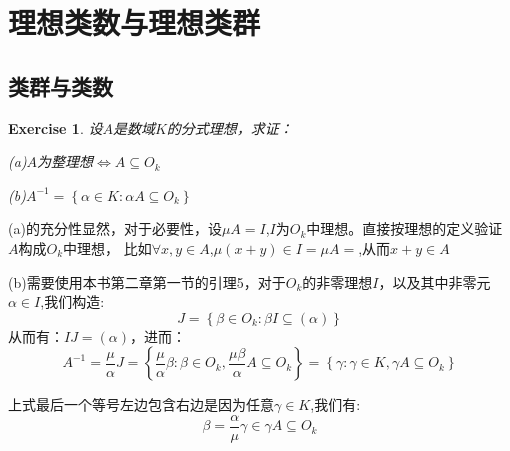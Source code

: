 \documentclass[12pt, a4paper]{ctexart}
\newenvironment{prooff}{{\noindent\it\textcolor{cyan!40!black}{Proof}:}\quad}{\par}
\newcommand{\bbrace}[1]{\left\{ #1 \right\} }
\newtheorem{exer}{Exercise}[subsection]
\begin{document}
\section{理想类数与理想类群}
\subsection{类群与类数}
\begin{exer}
    设$A$是数域$K$的分式理想，求证：

    (a)$A$为整理想$\Leftrightarrow A\subseteq O_{k} $

    (b)$A^{-1}=\bbrace{\alpha \in K:\alpha A\subseteq O_{k}}$
\end{exer}
\begin{prooff}
    (a)的充分性显然，对于必要性，设$\mu A=I$,$I$为$O_{k}$中理想。直接按理想的定义验证$A$构成$O_{k}$中理想，
    比如$\forall x,y\in A$,$\mu(x+y)\in I=\mu A=$,从而$x+y\in A$

    (b)需要使用本书第二章第一节的引理5，对于$O_{k}$的非零理想$I$，以及其中非零元$\alpha\in I$,我们构造:
    \begin{equation*}
        J=\bbrace{\beta \in O_{k}:\beta I\subseteq (\alpha)}
    \end{equation*}
    从而有：$IJ=(\alpha)$，进而：
    \begin{equation*}
        A^{-1}=\frac{\mu}{\alpha}J=\bbrace{\frac{\mu}{\alpha}\beta :\beta\in O_{k},
            \frac{\mu \beta }{\alpha}A\subseteq O_{k}}=\bbrace{\gamma:\gamma\in K ,\gamma A\subseteq O_{k}}
    \end{equation*}

    上式最后一个等号左边包含右边是因为任意$\gamma\in K$,我们有:
    \begin{equation*}
        \beta = \frac{\alpha}{\mu }\gamma \in \gamma A \subseteq  O_{k}
    \end{equation*}
\end{prooff}
\end{document}
